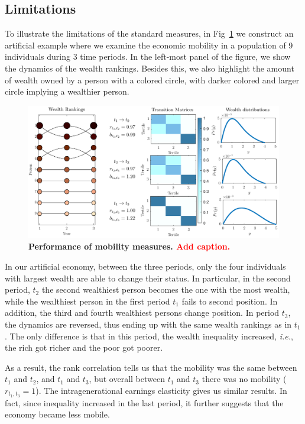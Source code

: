 \documentclass[11pt]{article}
\newcommand{\ie}{{\it i.e.}\xspace}
\numberwithin{equation}{section}
\begin{document}
\subsection{Limitations}

To illustrate the limitations of the standard measures, in Fig~\ref{fig:standard-mobility-measures} we construct an artificial example where we examine the economic mobility in a population of 9 individuals during 3 time periods. In the left-most panel of the figure, we show the dynamics of the wealth rankings. Besides this, we also highlight the amount of wealth owned by a person with a colored circle, with darker colored and larger circle implying a wealthier person. 
\begin{figure}[t!]
\includegraphics[width=\linewidth]{figs/fig_mobility_measures.pdf}
\caption{\textbf{Performance of mobility measures. \textcolor{red}{Add caption.}} \label{fig:standard-mobility-measures}}
\end{figure}

In our artificial economy, between the three periods, only the four individuals with largest wealth are able to change their status. In particular, in the second period, $t_2$ the second wealthiest person becomes the one with the most wealth, while the wealthiest person in the first period $t_1$ fails to second position. In addition, the third and fourth wealthiest persons change position. In period $t_3$, the dynamics are reversed, thus ending up with the same wealth rankings as in $t_1$. The only difference is that in this period, the wealth inequality increased, \ie, the rich got richer and the poor got poorer. 

As a result, the rank correlation tells us that the mobility was the same between $t_1$ and $t_2$, and $t_1$ and $t_3$, but overall between $t_1$ and $t_3$ there was no mobility ($r_{t_1,t_3} = 1$). The intragenerational earnings elasticity gives us similar results. In fact, since inequality increased in the last period, it further suggests that the economy became less mobile. 
\end{document}
